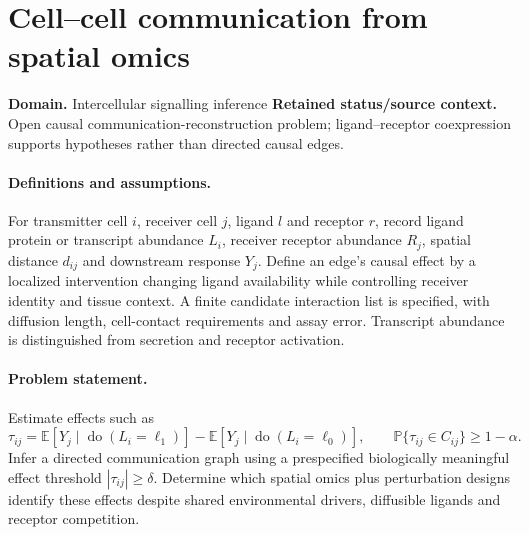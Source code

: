 \documentclass[11pt]{article}
\begin{document}
\section*{Cell–cell communication from spatial omics}
\label{prob:076}
\label{rank:64}
\par\smallskip

\noindent\textbf{Domain.} Intercellular signalling inference \quad \textbf{Retained status/source context.} Open causal communication-reconstruction problem; ligand--receptor coexpression supports hypotheses rather than directed causal edges.
\paragraph{Definitions and assumptions.} For transmitter cell $i$, receiver cell $j$, ligand $l$ and receptor $r$, record ligand protein or transcript abundance $L_i$, receiver receptor abundance $R_j$, spatial distance $d_{ij}$ and downstream response $Y_j$. Define an edge's causal effect by a localized intervention changing ligand availability while controlling receiver identity and tissue context. A finite candidate interaction list is specified, with diffusion length, cell-contact requirements and assay error. Transcript abundance is distinguished from secretion and receptor activation.
\paragraph{Problem statement.} Estimate effects such as
\[\tau_{ij}=\mathbb{E}[Y_j\mid\operatorname{do}(L_i=\ell_1)]-\mathbb{E}[Y_j\mid\operatorname{do}(L_i=\ell_0)],\qquad \mathbb{P}\{\tau_{ij}\in C_{ij}\}\ge1-\alpha.\]
Infer a directed communication graph using a prespecified biologically meaningful effect threshold $|\tau_{ij}|\ge\delta$. Determine which spatial omics plus perturbation designs identify these effects despite shared environmental drivers, diffusible ligands and receptor competition.
\end{document}
